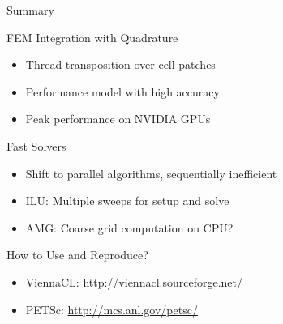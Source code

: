 %
%

\begin{frame}{Summary}

 \begin{block}{FEM Integration with Quadrature}
   \begin{itemize}
    \item Thread transposition over cell patches
    \item Performance model with high accuracy
    \item Peak performance on NVIDIA GPUs
   \end{itemize}
 \end{block}

  \begin{block}{Fast Solvers}
   \begin{itemize}
    \item Shift to parallel algorithms, sequentially inefficient
    \item ILU: Multiple sweeps for setup and solve
    \item AMG: Coarse grid computation on CPU?
   \end{itemize}
 \end{block}

 \begin{block}{How to Use and Reproduce?}
   \begin{itemize}
    \item ViennaCL: \url{http://viennacl.sourceforge.net/}
    \item PETSc: \url{http://mcs.anl.gov/petsc/}
   \end{itemize}
 \end{block}

\end{frame}

